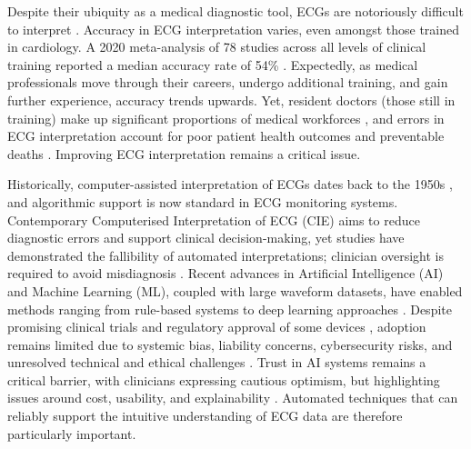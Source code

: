 \documentclass[
  10pt,
  letterpaper,
]{article}
\begin{document}
Despite their ubiquity as a medical diagnostic tool, ECGs are
notoriously difficult to interpret
\citep{salerno_2003, cook_2020, rafie_2021}. Accuracy in ECG
interpretation varies, even amongst those trained in cardiology. A 2020
meta-analysis of 78 studies across all levels of clinical training
reported a median accuracy rate of 54\% \citep{cook_2020}. Expectedly,
as medical professionals move through their careers, undergo additional
training, and gain further experience, accuracy trends upwards. Yet,
resident doctors (those still in training) make up significant
proportions of medical workforces \citep{nhs_stats}, and errors in ECG
interpretation account for poor patient health outcomes and preventable
deaths \citep{mele_2008}. Improving ECG interpretation remains a
critical issue.

Historically, computer-assisted interpretation of ECGs dates back to the
1950s \citep{macfarlane_automated_2021}, and algorithmic support is now
standard in ECG monitoring systems. Contemporary Computerised
Interpretation of ECG (CIE) aims to reduce diagnostic errors and support
clinical decision-making, yet studies have demonstrated the fallibility
of automated interpretations; clinician oversight is required to avoid
misdiagnosis
\citep{smulyan_computerized_2019, schlapfer_computer-interpreted_2017}.
Recent advances in Artificial Intelligence (AI) and Machine Learning
(ML), coupled with large waveform datasets, have enabled methods ranging
from rule-based systems to deep learning approaches
\citep{gupta_computer-interpreted_2024, gill_artificial_2023, lyon_computational_2018}.
Despite promising clinical trials and regulatory approval of some
devices \citep{himmelreich_diagnostic_2023}, adoption remains limited
due to systemic bias, liability concerns, cybersecurity risks, and
unresolved technical and ethical challenges
\citep{khurshid_clinical_2023, siontis_artificial_2021, elul_meeting_2021, chung_clinical_2022, rajpurkar_ai_2022}.
Trust in AI systems remains a critical barrier, with clinicians
expressing cautious optimism, but highlighting issues around cost,
usability, and explainability
\citep{schepart_artificial_2023, stewart_attitudes_2024, burgess_healthcare_2023, asan_artificial_2020}.
Automated techniques that can reliably support the intuitive
understanding of ECG data are therefore particularly important.
\end{document}
